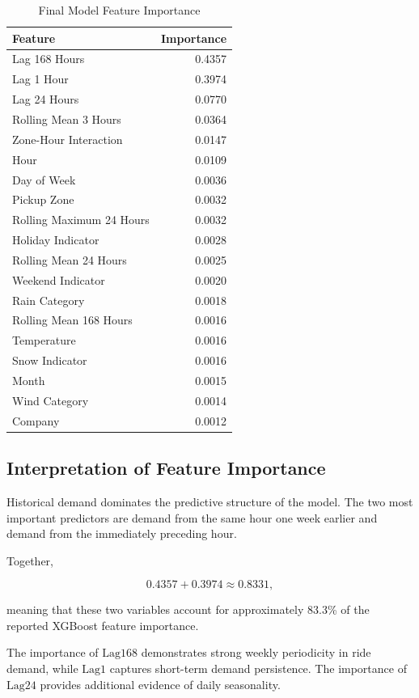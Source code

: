 \documentclass[11pt]{article}
\begin{document}
\begin{table}[H]
\centering
\caption{Final Model Feature Importance}
\begin{tabular}{lr}
\toprule
Feature & Importance \\
\midrule
Lag 168 Hours & 0.4357 \\
Lag 1 Hour & 0.3974 \\
Lag 24 Hours & 0.0770 \\
Rolling Mean 3 Hours & 0.0364 \\
Zone-Hour Interaction & 0.0147 \\
Hour & 0.0109 \\
Day of Week & 0.0036 \\
Pickup Zone & 0.0032 \\
Rolling Maximum 24 Hours & 0.0032 \\
Holiday Indicator & 0.0028 \\
Rolling Mean 24 Hours & 0.0025 \\
Weekend Indicator & 0.0020 \\
Rain Category & 0.0018 \\
Rolling Mean 168 Hours & 0.0016 \\
Temperature & 0.0016 \\
Snow Indicator & 0.0016 \\
Month & 0.0015 \\
Wind Category & 0.0014 \\
Company & 0.0012 \\
\bottomrule
\end{tabular}
\end{table}


\subsection{Interpretation of Feature Importance}

Historical demand dominates the predictive structure of the model.
The two most important predictors are demand from the same hour one
week earlier and demand from the immediately preceding hour.

Together,

\begin{equation}
0.4357 + 0.3974 \approx 0.8331,
\end{equation}

meaning that these two variables account for approximately 83.3\%
of the reported XGBoost feature importance.

The importance of $\mathrm{Lag168}$ demonstrates strong weekly
periodicity in ride demand, while $\mathrm{Lag1}$ captures
short-term demand persistence. The importance of $\mathrm{Lag24}$
provides additional evidence of daily seasonality.
\end{document}
